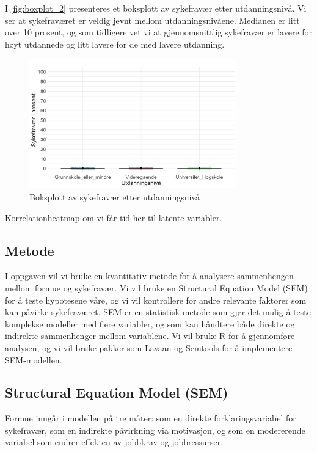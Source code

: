 \documentclass[
  12pt,
  a4paper,
  DIV=11,
  numbers=noendperiod]{scrartcl}
\begin{document}
I \autoref{fig:boxplot_2} presenteres et boksplott av sykefravær etter
utdanningsnivå. Vi ser at sykefraværet er veldig jevnt mellom
utdanningsnivåene. Medianen er litt over 10 prosent, og som tidligere
vet vi at gjennomsnittlig sykefravær er lavere for høyt utdannede og
litt lavere for de med lavere utdanning.

\begin{figure}[H]
\caption{Boksplott av sykefravær etter utdanningsnivå}
\label{fig:boxplot_2}
\centering
\includegraphics[width=0.8\textwidth]{dokumentobjekter/figurer/fig_7.png}
\end{figure}

Korrelationheatmap om vi får tid her til latente variabler.

\subsection{Metode}\label{metode}

I oppgaven vil vi bruke en kvantitativ metode for å analysere
sammenhengen mellom formue og sykefravær. Vi vil bruke en Structural
Equation Model (SEM) for å teste hypotesene våre, og vi vil kontrollere
for andre relevante faktorer som kan påvirke sykefraværet. SEM er en
statistisk metode som gjør det mulig å teste komplekse modeller med
flere variabler, og som kan håndtere både direkte og indirekte
sammenhenger mellom variablene. Vi vil bruke R for å gjennomføre
analysen, og vi vil bruke pakker som Lavaan og Semtools for å
implementere SEM-modellen.

\subsection{Structural Equation Model
(SEM)}\label{structural-equation-model-sem}

Formue inngår i modellen på tre måter: som en direkte
forklaringsvariabel for sykefravær, som en indirekte påvirkning via
motivasjon, og som en modererende variabel som endrer effekten av
jobbkrav og jobbressurser.
\end{document}
